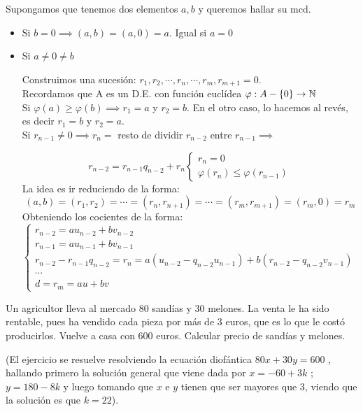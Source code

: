 \begin{nprop}
Supongamos que tenemos dos elementos $a,b$ y queremos hallar su mcd.

\begin{itemize}

	\item Si $b=0 \implies (a,b) = (a,0) = a$. Igual si $a=0$

	\item Si $a \ne 0 \ne b$

	Construimos una sucesión: $r_1,r_2,\cdots, r_n, \cdots , r_m, r_{m+1} = 0$.\\
	Recordamos que A es un D.E. con función euclídea $\varphi : A-\{0\} \to \mathbb{N} $\\
	Si $\varphi(a) \geq \varphi(b)\implies r_1 = a$ y $r_2 = b$. En el otro caso, lo hacemos al revés, es decir  $r_1 = b $ y $r_2 = a$.\\
	Si $r_{n-1} \ne 0 \implies r_n= $ resto de dividir $r_{n-2}$ entre $r_{n-1} \implies$

	\[
	r_{n-2} = r_{n-1}q_{n-2} + r_n \begin{cases}
	 r_n = 0 \\
	  \varphi(r_n) \leq \varphi(r_{n-1})
\end{cases}
	 \]
La idea es ir reduciendo de la forma:
\[ (a,b) = (r_1,r_2) = \cdots = (r_n,r_{n+1}) = \cdots = (r_m, r_{m+1}) = (r_m,0) = r_m\]
Obteniendo los cocientes de la forma:
\[\begin{cases}
	r_{n-2} = au_{n-2} + bv_{n-2}\\

r_{n-1} = au_{n-1} + bv_{n-1}\\

r_{n-2} - r_{n-1}q_{n-2} = r_n = a(u_{n-2} - q_{n-2}u_{n-1}) + b(r_{n-2}-q_{n-2}v_{n-1})\\
\cdots \\

d = r_m = au + bv
\end{cases}
\quad
\]

	\end{itemize}
\end{nprop}

\begin{ejemplo}
  Un agricultor lleva al mercado 80 sandías y 30 melones. La venta le ha sido rentable, pues ha vendido cada pieza por más de 3 euros, que es lo que le costó producirlos. Vuelve a casa con 600 euros. Calcular precio de sandías y melones.

	(El ejercicio se resuelve resolviendo la ecuación diofántica $80x +30y = 600$ , hallando primero la solución general que viene dada por $x = -60 + 3k$ ; $y = 180 - 8k$ y luego tomando que $x$ e $y$ tienen que ser mayores que 3, viendo que la solución es que $k=22$).
\end{ejemplo}

